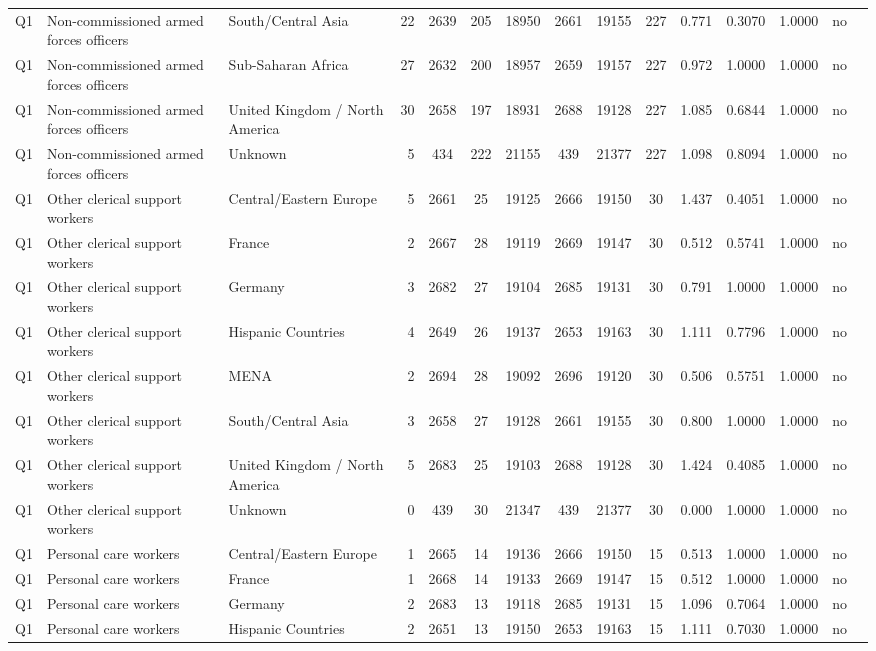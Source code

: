 \begin{longtable}{lllrcccccccccll}
Q1 & Non-commissioned armed forces officers & South/Central Asia & 22 & 2639 & 205 & 18950 & 2661 & 19155 & 227 & 0.771 & 0.3070 & 1.0000 & no \\
Q1 & Non-commissioned armed forces officers & Sub-Saharan Africa & 27 & 2632 & 200 & 18957 & 2659 & 19157 & 227 & 0.972 & 1.0000 & 1.0000 & no \\
Q1 & Non-commissioned armed forces officers & United Kingdom / North America & 30 & 2658 & 197 & 18931 & 2688 & 19128 & 227 & 1.085 & 0.6844 & 1.0000 & no \\
Q1 & Non-commissioned armed forces officers & Unknown & 5 & 434 & 222 & 21155 & 439 & 21377 & 227 & 1.098 & 0.8094 & 1.0000 & no \\
Q1 & Other clerical support workers & Central/Eastern Europe & 5 & 2661 & 25 & 19125 & 2666 & 19150 & 30 & 1.437 & 0.4051 & 1.0000 & no \\
Q1 & Other clerical support workers & France & 2 & 2667 & 28 & 19119 & 2669 & 19147 & 30 & 0.512 & 0.5741 & 1.0000 & no \\
Q1 & Other clerical support workers & Germany & 3 & 2682 & 27 & 19104 & 2685 & 19131 & 30 & 0.791 & 1.0000 & 1.0000 & no \\
Q1 & Other clerical support workers & Hispanic Countries & 4 & 2649 & 26 & 19137 & 2653 & 19163 & 30 & 1.111 & 0.7796 & 1.0000 & no \\
Q1 & Other clerical support workers & MENA & 2 & 2694 & 28 & 19092 & 2696 & 19120 & 30 & 0.506 & 0.5751 & 1.0000 & no \\
Q1 & Other clerical support workers & South/Central Asia & 3 & 2658 & 27 & 19128 & 2661 & 19155 & 30 & 0.800 & 1.0000 & 1.0000 & no \\
Q1 & Other clerical support workers & United Kingdom / North America & 5 & 2683 & 25 & 19103 & 2688 & 19128 & 30 & 1.424 & 0.4085 & 1.0000 & no \\
Q1 & Other clerical support workers & Unknown & 0 & 439 & 30 & 21347 & 439 & 21377 & 30 & 0.000 & 1.0000 & 1.0000 & no \\
Q1 & Personal care workers & Central/Eastern Europe & 1 & 2665 & 14 & 19136 & 2666 & 19150 & 15 & 0.513 & 1.0000 & 1.0000 & no \\
Q1 & Personal care workers & France & 1 & 2668 & 14 & 19133 & 2669 & 19147 & 15 & 0.512 & 1.0000 & 1.0000 & no \\
Q1 & Personal care workers & Germany & 2 & 2683 & 13 & 19118 & 2685 & 19131 & 15 & 1.096 & 0.7064 & 1.0000 & no \\
Q1 & Personal care workers & Hispanic Countries & 2 & 2651 & 13 & 19150 & 2653 & 19163 & 15 & 1.111 & 0.7030 & 1.0000 & no \\

\end{longtable}
